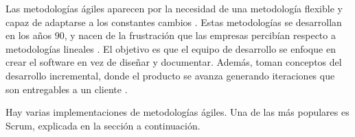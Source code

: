 \par Las metodologías ágiles aparecen por la necesidad de una metodología flexible y capaz de adaptarse a los constantes cambios \cite{bartoszScrumVideoGames2023}. Estas metodologías se desarrollan en los años 90, y nacen de la frustración que las empresas percibían respecto a metodologías lineales \cite{sommervilleIngenieriaSoftware9a2011,pressmanIngenieriaSoftwareEnfoque2013}. 
El objetivo es que el equipo de desarrollo se enfoque en crear el software en vez de diseñar y documentar. Además, toman conceptos del desarrollo incremental, donde el producto se avanza generando iteraciones que son entregables a un cliente \cite{pressmanIngenieriaSoftwareEnfoque2013}.

\par Hay varias implementaciones de metodologías ágiles. Una de las más populares es Scrum, explicada en la sección a continuación.
